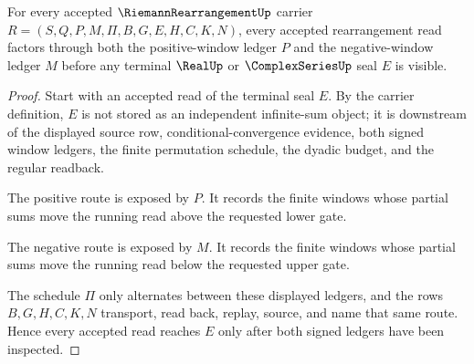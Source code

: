 \begin{theorem}
\label{thm:riemann-rearrangement-positive-negative-ledger}
For every accepted $\RiemannRearrangementUp$ carrier $R=(S,Q,P,M,\Pi,B,G,E,H,C,K,N)$, every accepted rearrangement read factors through both the positive-window ledger $P$ and the negative-window ledger $M$ before any terminal $\RealUp$ or $\ComplexSeriesUp$ seal $E$ is visible.
\end{theorem}
\begin{proof}
Start with an accepted read of the terminal seal $E$. By the carrier definition, $E$ is not stored as an independent infinite-sum object; it is downstream of the displayed source row, conditional-convergence evidence, both signed window ledgers, the finite permutation schedule, the dyadic budget, and the regular readback.

The positive route is exposed by $P$. It records the finite windows whose partial sums move the running read above the requested lower gate.

The negative route is exposed by $M$. It records the finite windows whose partial sums move the running read below the requested upper gate.

The schedule $\Pi$ only alternates between these displayed ledgers, and the rows $B,G,H,C,K,N$ transport, read back, replay, source, and name that same route. Hence every accepted read reaches $E$ only after both signed ledgers have been inspected.
\end{proof}

